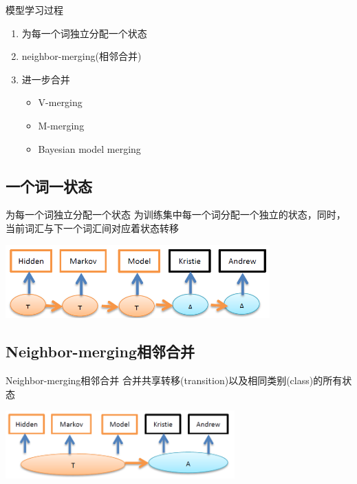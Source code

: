 \documentclass{beamer}
\begin{document}
\begin{frame}{模型学习过程}
    \begin{enumerate}
        \item 为每一个词独立分配一个状态
        \item neighbor-merging(相邻合并)
        \item 进一步合并
            \begin{itemize}
                \item V-merging
                \item M-merging
                \item Bayesian model merging
            \end{itemize}
    \end{enumerate}
\end{frame}

\subsection{一个词一状态}
\begin{frame}{为每一个词独立分配一个状态}
    为训练集中每一个词分配一个独立的状态，同时，当前词汇与下一个词汇间对应着状态转移
            \pause
    \begin{center}
        \includegraphics[height=80pt]{report5/neighbor-1.png}
    \end{center}
\end{frame}

\subsection{Neighbor-merging相邻合并}
\begin{frame}{Neighbor-merging相邻合并}
    合并共享转移(transition)以及相同类别(class)的所有状态
            \pause
    \begin{center}
        \includegraphics[width=250pt]{report5/neighbor-2.png}
    \end{center}
\end{frame}
\end{document}
